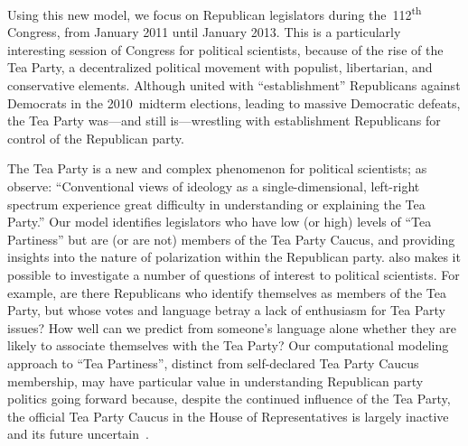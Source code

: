 Using this new model, we focus on Republican legislators during
the~112\textsuperscript{th} \us{} Congress, from January 2011 until
January 2013.  This is a particularly interesting session of Congress
for political scientists, because of the rise of the Tea Party, a
decentralized political movement with populist, libertarian, and
conservative elements.  Although united with ``establishment''
Republicans against Democrats in the 2010~midterm elections,
leading to massive Democratic defeats, the Tea Party was---and still
is---wrestling with establishment Republicans for control of the
Republican party.

The Tea Party is a new and complex phenomenon for political
scientists; as  observe: ``Conventional views
of ideology as a single-dimensional, left-right spectrum experience
great difficulty in understanding or explaining the Tea Party.''  Our
model identifies legislators who have low (or high) levels of ``Tea
Partiness'' but are (or are not) members of the Tea Party Caucus, 
and providing insights into the nature of polarization within the
Republican party. \name{} also makes it possible to investigate a number of questions of interest to
political scientists. For example, are there Republicans who identify
themselves as members of the Tea Party, but whose votes and language
betray a lack of enthusiasm for Tea Party issues?  How well can we
predict from someone's language alone whether they are likely to
associate themselves with the Tea Party?  Our computational modeling approach to ``Tea
Partiness'', distinct from self-declared Tea Party Caucus membership, 
may have particular value in understanding Republican
party politics going forward because, despite the continued
influence of the Tea Party, the official Tea Party Caucus in the
House of Representatives is largely inactive and its future uncertain~\cite{fuller2015}.





